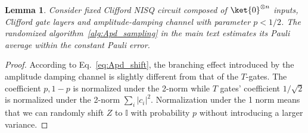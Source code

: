 \documentclass[aps,%
twocolumn,%
floatfix,%
pra,%
amsfonts,%
longbibliography,%
groupedaddress,%
superscriptaddress]{revtex4-2}%
\newtheorem{lemma}{Lemma}
\newcommand{\1}{\mathbbm{1}}
\begin{document}
\begin{lemma}
\label{lemma:noisy_Clifford}
    Consider fixed Clifford NISQ circuit composed of $\ket{0}^{\otimes n}$ inputs, Clifford gate layers and amplitude-damping channel with parameter $p<1/2$.   The randomized algorithm~\ref{alg:Apd_sampling} in the main text estimates its Pauli average within the constant Pauli error.
\end{lemma}
\begin{proof}
    According to Eq.~\eqref{eq:Apd_shift}, the branching effect introduced by the amplitude damping channel is slightly different from that of the $T$-gates. The coefficient $p, 1-p$ is normalized under the 2-norm while $T$ gates' coefficient $1/\sqrt{2}$ is normalized under the 2-norm $\sum_{i} |c_i|^2$. Normalization under the 1 norm means that we can randomly shift $Z$ to $\mathbb{I}$ with probability $p$ without introducing a larger variance.



\end{proof}
\end{document}

